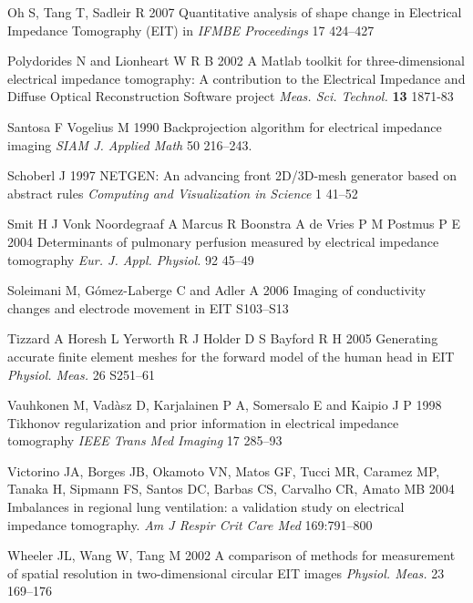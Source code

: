 \documentclass[12pt]{iopart}
\begin{document}
\item[]
Oh S, Tang T, Sadleir R 2007
Quantitative analysis of shape change in Electrical Impedance Tomography (EIT)
in {\em IFMBE Proceedings}
17 424--427

\item[]
Polydorides N and Lionheart W R B 2002 A Matlab toolkit for
three-dimensional electrical impedance tomography: A contribution
to the Electrical Impedance and Diffuse Optical Reconstruction
Software project {\em Meas. Sci. Technol.} {\bf 13} 1871-83

\item[]
Santosa F Vogelius M 1990
Backprojection algorithm for electrical impedance imaging
{\em SIAM J. Applied Math}
50 216--243. 

\item[]
Schoberl J 1997
NETGEN: An advancing front 2D/3D-mesh generator based on abstract rules
{\em Computing and Visualization in Science}
1 41--52 

\item[]
Smit H J
Vonk Noordegraaf A
Marcus R
Boonstra A
de Vries P M 
Postmus P E
2004
Determinants of pulmonary perfusion measured by electrical impedance tomography
{\em Eur. J. Appl. Physiol.}
92 45--49

\item[]
Soleimani M, G\'omez-Laberge C and Adler A 2006 Imaging of
conductivity changes and electrode movement in EIT 
S103--S13

\item[]
Tizzard A Horesh L Yerworth R J Holder D S Bayford R H 2005
Generating accurate finite element meshes for the forward
model of the human head in EIT
{\em Physiol. Meas.}
 26 S251--61 

\item[]
Vauhkonen M, Vad\`asz D, Karjalainen P A, Somersalo E and
Kaipio J P 1998
 Tikhonov regularization and prior information in
electrical impedance tomography
 {\em IEEE Trans Med Imaging}
17 285--93

\item[]
Victorino JA, Borges JB, Okamoto VN, Matos GF, Tucci MR, Caramez MP, Tanaka H, Sipmann FS, Santos DC, Barbas CS, Carvalho CR, Amato MB 2004
Imbalances in regional lung ventilation: a validation study on
electrical impedance tomography.
{\em Am J Respir Crit Care Med} 169:791--800

\item[]
Wheeler JL, Wang W, Tang M 2002
A comparison of methods for measurement of spatial resolution in two-dimensional circular EIT images
{\em Physiol. Meas.}
23 169--176
\end{document}
